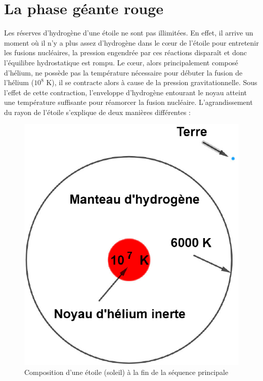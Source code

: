 \section{La phase géante rouge}\label{2.2}

Les réserves d’hydrogène d’une étoile ne sont pas illimitées. En effet, il arrive un moment où il n’y a plus assez d’hydrogène dans le cœur de l’étoile pour entretenir les fusions nucléaires, la pression engendrée par ces réactions disparaît et donc l’équilibre hydrostatique est rompu. Le cœur, alors principalement composé d’hélium, ne possède pas la température nécessaire pour débuter la fusion de l’hélium ($10^{8}$ K), il se contracte alors à cause de la pression gravitationnelle. Sous l’effet de cette contraction, l’enveloppe d’hydrogène entourant le noyau atteint une température suffisante pour réamorcer la fusion nucléaire. L’agrandissement du rayon de l’étoile s’explique de deux manières différentes :

\begin{figure}[H]\vspace{1cm}
	\centering
	\includegraphics[scale=0.45]{images/compo_sp}
	\caption[Composition d'une étoile (soleil) à la fin de la séquence principale -figure réalisée avec GeoGebra]{Composition d'une étoile (soleil) à la fin de la séquence principale}
	\label{Fig. 2.3}
\end{figure}\bigskip                         

